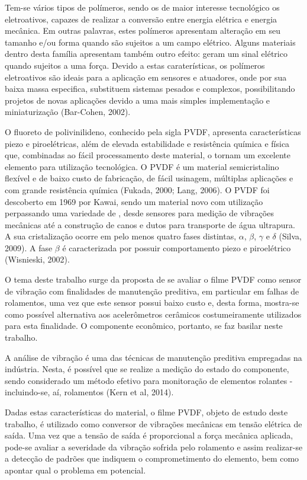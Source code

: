 \documentclass[
	12pt,				
	oneside,			
	a4paper,			
	english,			
	brazil				
	]{abntex2ppgsi}
\begin{document}
Tem-se vários tipos de polímeros, sendo os de maior interesse tecnológico os eletroativos, capazes de realizar a conversão entre energia elétrica e energia mecânica. Em outras palavras, estes polímeros apresentam alteração em seu tamanho e/ou forma quando são sujeitos a um campo elétrico. Alguns  materiais dentro desta família apresentam também outro efeito: geram um sinal elétrico quando sujeitos a uma força. Devido a estas caraterísticas, os polímeros eletroativos são ideais para a aplicação em sensores e atuadores, onde por sua baixa massa especifica, substituem sistemas pesados e complexos, possibilitando projetos de novas aplicações devido a uma mais simples implementação e miniaturização (Bar-Cohen, 2002).

O fluoreto de polivinilideno, conhecido pela sigla PVDF, apresenta características piezo e piroelétricas, além de elevada estabilidade e resistência química e física que, combinadas ao fácil processamento deste material, o tornam um excelente elemento para utilização tecnológica. O PVDF é um material semicristalino flexível e de baixo custo de fabricação, de fácil usinagem, múltiplas aplicações e com grande resistência química (Fukada, 2000; Lang, 2006). O PVDF foi descoberto em 1969 por Kawai, sendo um material novo com utilização perpassando uma variedade de , desde sensores para medição de vibrações mecânicas até a construção de canos e dutos para transporte de água ultrapura. A sua cristalização ocorre em pelo menos quatro fases distintas, $\alpha$, $\beta$, $\gamma$ e $\delta$ (Silva, 2009). A fase $\beta$ é caracterizada por possuir comportamento piezo e piroelétrico (Wisnieski, 2002).

O tema deste trabalho surge da proposta de se avaliar o filme PVDF como sensor de vibração com finalidades de manutenção preditiva, em particular em falhas de rolamentos, uma vez que este sensor possui baixo custo e, desta forma, mostra-se como possível alternativa aos acelerômetros cerâmicos costumeiramente utilizados para esta finalidade. O componente econômico, portanto, se faz basilar neste trabalho. 

A análise de vibração é uma das técnicas de manutenção preditiva empregadas na indústria. Nesta, é possível que se realize a medição do estado do componente, sendo considerado um método efetivo para monitoração de elementos rolantes - incluindo-se, aí, rolamentos (Kern et al, 2014). 

Dadas estas características do material, o filme PVDF, objeto de estudo deste trabalho, é utilizado como conversor de vibrações mecânicas em tensão elétrica de saída. Uma vez que a tensão de saída é proporcional a força mecânica aplicada, pode-se avaliar a severidade da vibração sofrida pelo rolamento e assim realizar-se a detecção de padrões que indiquem o comprometimento do elemento, bem como apontar qual o problema em potencial.
\end{document}
